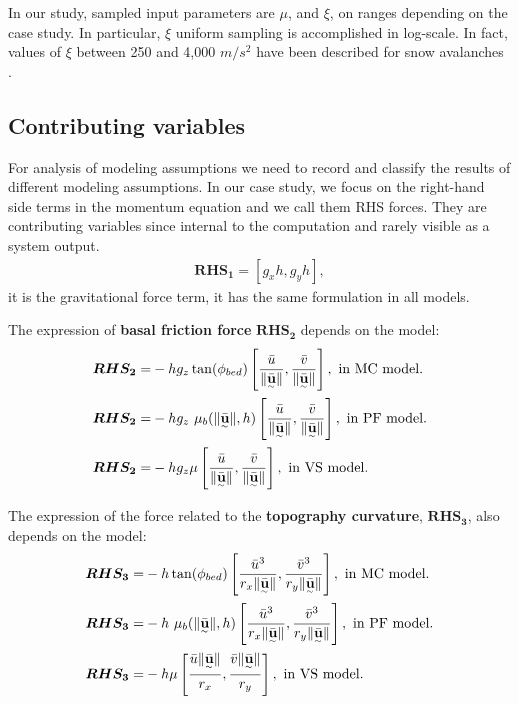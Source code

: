 \documentclass{article}
\begin{document}
In our study, sampled input parameters are $\mu$, and $\xi$, on ranges depending on the case study. In particular, $\xi$ uniform sampling is accomplished in log-scale. In fact, values of $\xi$ between 250 and 4,000 $m/s^2$ have been described for snow avalanches \citep{Salm1993,Bartelt1999,Gruber2007}.

\subsection{Contributing variables}\label{sec:Fterms}
For analysis of modeling assumptions we need to record and classify the results of different modeling assumptions. In our case study, we focus on the right-hand side terms in the momentum equation and we call them RHS forces. They are contributing variables since internal to the computation and rarely visible as a system output.
\begin{align}
\boldsymbol{RHS_1} = [g_x h,g_y h],
\end{align}
it is the gravitational force term, it has the same formulation in all models.

The expression of {\bf basal friction force} $\boldsymbol{RHS_2}$ depends on the model:
\begin{align}
\boldsymbol{RHS_2} =& -h g_z\tan(\phi_{bed})\left[\frac{\bar{u}}{\| \underset{^\sim}{\bar{\textbf u}} \|}, \frac{\bar{v}}{\| \underset{^\sim}{\bar{\textbf u}} \|} \right],\textmd{ in MC model.}\nonumber\\
\boldsymbol{RHS_2} =& - h g_z \ \mu_{b}(\|\underset{^\sim}{\bar{\textbf{u}}} \| , h)\left[\frac{\bar{u}}{\| \underset{^\sim}{\bar{\textbf{u}}} \|}, \frac{\bar{v}}{\| \underset{^\sim}{\bar{\textbf{u}}} \|}\right],\textmd{ in PF model.}\\
\boldsymbol{RHS_2} =& -h g_{z} \mu\left[\frac{\bar{u}}{\| \underset{^\sim}{\bar{\textbf u}}\|} , \frac{\bar{v}}{\| \underset{^\sim}{\bar{\textbf u}}\|}\right],\textmd{ in VS model.}\nonumber
\end{align}

The expression of the force related to the {\bf topography curvature}, $\boldsymbol{RHS_3}$, also depends on the model:
\begin{align}
\boldsymbol{RHS_3} =&-h \tan(\phi_{bed})\left[\frac{\bar{u}^3}{r_x\| \underset{^\sim}{\bar{\textbf{u}}} \|}, \frac{\bar{v}^3}{r_y\| \underset{^\sim}{\bar{\textbf{u}}} \|}\right],\textmd{ in MC model.}\nonumber\\
\boldsymbol{RHS_3} =& -h\ \mu_{b}(\|\underset{^\sim}{\bar{\textbf{u}}} \|,h)\left[\frac{\bar{u}^3}{r_x\| \underset{^\sim}{\bar{\textbf{u}}} \|}, \frac{\bar{v}^3}{r_y\| \underset{^\sim}{\bar{\textbf{u}}} \|}\right],\textmd{ in PF model.}\\
\boldsymbol{RHS_3} =& -h \mu\left[\frac{\bar{u}\| \underset{^\sim}{\bar{\textbf u}} \|}{r_{x}},\frac{\bar{v}\| \underset{^\sim}{\bar{\textbf u}} \|}{r_{y}}\right],\textmd{ in VS model.}\nonumber
\end{align}
\end{document}
